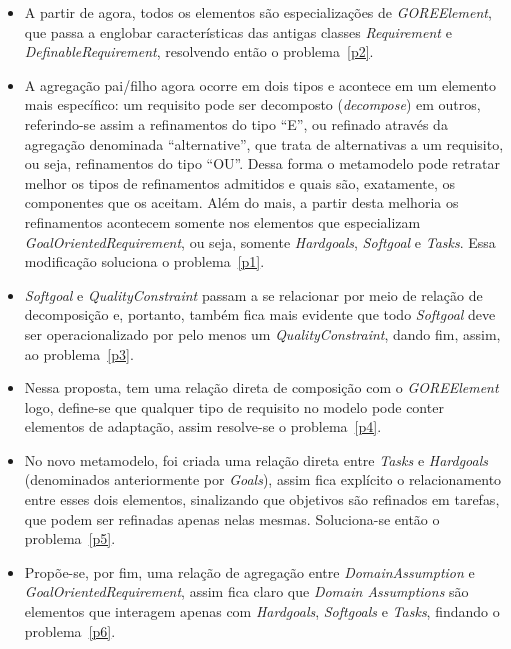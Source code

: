 \begin{itemize}
	\item A partir de agora, todos os elementos são especializações de \textit{GOREElement}, que passa a englobar características das antigas classes \textit{Requirement} e \textit{DefinableRequirement}, resolvendo então o problema~\ref{p2}. 

	\item A agregação pai/filho agora ocorre em dois tipos e acontece em um elemento mais específico: um requisito pode ser decomposto (\textit{decompose}) em outros, referindo-se assim a refinamentos do tipo ``E'', ou refinado através da agregação denominada ``alternative'', que trata de alternativas a um requisito, ou seja, refinamentos do tipo ``OU''. Dessa forma o metamodelo pode retratar melhor os tipos de refinamentos admitidos e quais são, exatamente, os componentes que  os aceitam. Além do mais, a partir desta melhoria os refinamentos acontecem somente nos elementos que especializam \textit{GoalOrientedRequirement}, ou seja, somente \textit{Hardgoals}, \textit{Softgoal} e \textit{Tasks}. Essa modificação soluciona o problema~\ref{p1}.
	
	\item \textit{Softgoal} e \textit{QualityConstraint} passam a se relacionar por meio de relação de decomposição e, portanto, também fica mais evidente que todo \textit{Softgoal} deve ser operacionalizado por pelo menos um \textit{QualityConstraint}, dando fim, assim, ao problema~\ref{p3}.
	
	\item Nessa proposta, \awreqs tem uma relação direta de composição com o \textit{GOREElement} logo, define-se que qualquer tipo de requisito no modelo pode conter elementos de adaptação, assim resolve-se o problema~\ref{p4}.
	
	\item No novo metamodelo, foi criada uma relação direta entre \textit{Tasks} e \textit{Hardgoals} (denominados anteriormente por \textit{Goals}), assim fica explícito o relacionamento entre esses dois elementos, sinalizando que objetivos são refinados em tarefas, que podem ser refinadas apenas nelas mesmas. Soluciona-se então o problema~\ref{p5}.
	
	\item Propõe-se, por fim, uma relação de agregação entre \textit{DomainAssumption} e \textit{GoalOrientedRequirement}, assim fica claro que \textit{Domain Assumptions} são elementos que interagem apenas com \textit{Hardgoals}, \textit{Softgoals} e \textit{Tasks}, findando o problema~\ref{p6}.
	
\end{itemize}


